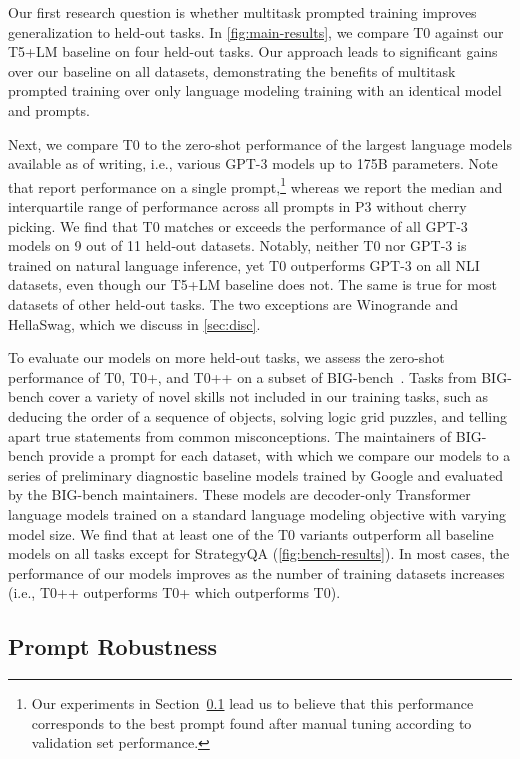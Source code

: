 Our first research question is whether multitask prompted training improves generalization to held-out tasks. In \autoref{fig:main-results}, we compare T0 against our T5+LM baseline on four held-out tasks. Our approach leads to significant gains over our baseline on all datasets, demonstrating the benefits of multitask prompted training over only language modeling training with an identical model and prompts.

Next, we compare T0 to the zero-shot performance of the largest language models available as of writing, i.e., various GPT-3 models up to 175B parameters. Note that \citet{gpt3} report performance on a single prompt,\footnote{Our experiments in Section~\ref{sec:robust} lead us to believe that this performance corresponds to the best prompt found after manual tuning according to validation set performance.} whereas we report the median and interquartile range of performance across all prompts in P3 without cherry picking. We find that T0 matches or exceeds the performance of all GPT-3 models on 9 out of 11 held-out datasets. Notably, neither T0 nor GPT-3 is trained on natural language inference, yet T0 outperforms GPT-3 on all NLI datasets, even though our T5+LM baseline does not. The same is true for most datasets of other held-out tasks. The two exceptions are Winogrande and HellaSwag, which we discuss in \autoref{sec:disc}.

To evaluate our models on more held-out tasks, we assess the zero-shot performance of T0, T0+, and T0++ on a subset of BIG-bench~\citep{bigbench}. Tasks from BIG-bench cover a variety of novel skills not included in our training tasks, such as deducing the order of a sequence of objects, solving logic grid puzzles, and telling apart true statements from common misconceptions. The maintainers of BIG-bench provide a prompt for each dataset, with which we compare our models to a series of preliminary diagnostic baseline models trained by Google and evaluated by the BIG-bench maintainers. These models are decoder-only Transformer language models trained on a standard language modeling objective with varying model size. We find that at least one of the T0 variants outperform all baseline models on all tasks except for StrategyQA (\autoref{fig:bench-results}). In most cases, the performance of our models improves as the number of training datasets increases (i.e., T0++ outperforms T0+ which outperforms T0). 

\subsection{Prompt Robustness}
\label{sec:robust}

